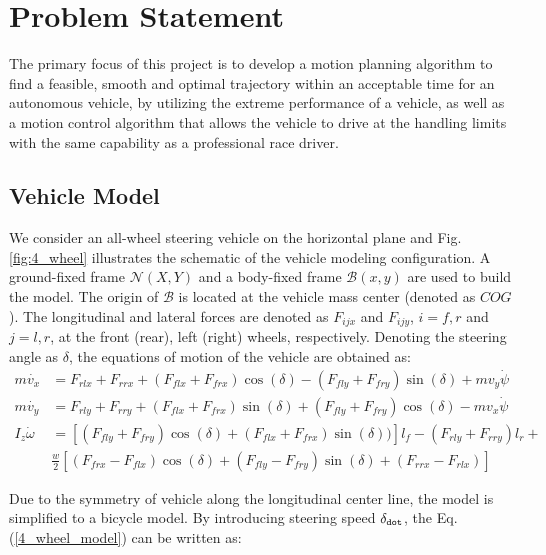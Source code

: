 \documentclass[conference, onecolumn]{IEEEtran}
\begin{document}
\section{Problem Statement}
The primary focus of this project is to develop a motion planning algorithm to find a feasible, smooth and optimal trajectory within an acceptable time for an autonomous vehicle, by utilizing the extreme performance of a vehicle, as well as a motion control algorithm that allows the vehicle to drive at the handling limits with the same capability as a professional race driver. 

\subsection{Vehicle Model}
We consider an all-wheel steering vehicle on the horizontal plane and Fig.\ref{fig:4_wheel} illustrates the schematic of the vehicle modeling configuration. A ground-fixed frame $\mathcal{N}(X,Y)$ and a body-fixed frame $\mathcal{B}(x,y)$ are used to build the model. The origin of $\mathcal{B}$ is located at the vehicle mass center (denoted as $COG$).
The longitudinal and lateral forces are denoted as $F_{ijx}$ and $F_{ijy}$, $i=f, r$ and $j=l,r$, at the front (rear), left (right) wheels, respectively. Denoting the steering angle as $\delta$, the equations of motion of the vehicle are obtained as:
\begin{equation}\label{4_wheel_model}
	\begin{aligned}
		m\dot{v_x} & = F_{rlx}+F_{rrx}+(F_{flx}+F_{frx})\cos(\delta)  -(F_{fly}+F_{fry})\sin(\delta)+mv_y\dot\psi \\
		m\dot{v_y} & = F_{rly}+F_{rry}+(F_{flx}+F_{frx})\sin(\delta)  +(F_{fly}+F_{fry})\cos(\delta)-mv_x\dot{\psi}\\
		I_z\dot{\omega} & = \left[(F_{fly}+F_{fry})\cos(\delta)+(F_{flx}+F_{frx})\sin(\delta))\right]l_f  -(F_{rly}+F_{rry})l_r + \\ 
		& \frac{w}{2}[(F_{frx}-F_{flx})\cos(\delta)  +(F_{fly}-F_{fry})\sin(\delta)+(F_{rrx}-F_{rlx})]
	\end{aligned}
\end{equation}

Due to the symmetry of vehicle along the longitudinal center line, the model is simplified to a bicycle model\cite{meywerk2015vehicle}. By introducing steering speed $\delta_{\tt dot}$, the Eq.(\ref{4_wheel_model}) can be written as:
\end{document}

